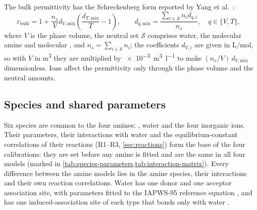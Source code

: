 The bulk permittivity has the Schreckenberg form reported by Yang et al.\ \cite{Yang2024}:
\begin{equation}
 \varepsilon_{\mathrm{bulk}}=1+\frac{n_s}{V}d_{V,\mathrm{mix}}
 \left(\frac{d_{T,\mathrm{mix}}}{T}-1\right),\qquad
 d_{q,\mathrm{mix}}=\frac{\sum_{i\in\mathcal S}n_i d_{q,i}}{n_s},
 \quad q\in\{V,T\},
 \label{eq:solvent-permittivity}
\end{equation}
where $V$ is the phase volume, the neutral set $\mathcal S$ comprises water, the molecular amine and molecular \COtwo, and $n_s=\sum_{i\in\mathcal S}n_i$; the coefficients $d_{V,i}$ are given in L/mol, so with $V$ in \si{\cubic\metre} they are multiplied by \SI{e-3}{\cubic\metre\per\litre} to make $(n_s/V)\,d_{V,\mathrm{mix}}$ dimensionless.
Ions affect the permittivity only through the phase volume and the neutral amounts.

\subsection{Species and shared parameters}\label{sec:species}
Six species are common to the four amines: \COtwo, water and the four inorganic ions.
Their parameters, their interactions with water and the equilibrium-constant correlations of their reactions (R1--R3, \cref{sec:reactions}) form the base of the four calibrations: they are set before any amine is fitted and are the same in all four models (marked in \cref{tab:species-parameters,tab:interaction-matrix}).
Every difference between the amine models lies in the amine species, their interactions and their own reaction correlations.
Water has one donor and one acceptor association site, with parameters fitted to the IAPWS-95 reference equation \cite{internationalassociationforthepropertiesofwaterandsteamRevisedReleaseIAPWS2018}, and \COtwo has one induced-association site of each type that bonds only with water \cite{Kleiner2007,Schick2023,Pabsch2020}.

